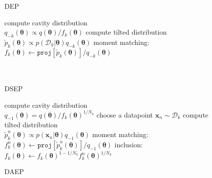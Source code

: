 \documentclass{article} %
\begin{document}
\begin{figure}[!t]
\begin{minipage}[t]{0.33\linewidth}
\centering
\begin{algorithm}[H] 
\caption{DEP} \small
\label{alg:dep} 
\begin{algorithmic}[1]
	\STATE compute cavity distribution \\$q_{-k}(\bm{\theta}) \propto q(\bm{\theta}) / f_k(\bm{\theta})$ 
	\STATE compute tilted distribution \\$\tilde{p}_k(\bm{\theta}) \propto p(\mathcal{D}_k|\bm{\theta}) q_{-k}(\bm{\theta})$
	\STATE moment matching: \\ \hspace{-3mm}$f_k(\bm{\theta}) \leftarrow \mathtt{proj}[\tilde{p}_k(\bm{\theta})] / q_{-k}(\bm{\theta}) $ \\
\hspace{1mm}\\ \vspace{1.5mm} \hspace{1mm}\\
\end{algorithmic}
\end{algorithm}
\end{minipage}
%
\begin{minipage}[t]{0.33\linewidth}
\centering
\begin{algorithm}[H] 
\caption{DSEP} \small
\label{alg:dsep} 
\begin{algorithmic}[1] 
	\STATE compute cavity distribution \\$q_{-1}(\bm{\theta}) = q(\bm{\theta}) / f_k(\bm{\theta})^{1 / N_k}$
	\STATE choose a datapoint $\bm{x}_n \sim \mathcal{D}_k$
	\STATE compute tilted distribution \\$\tilde{p}_k^n(\bm{\theta}) \propto p(\bm{x}_n|\bm{\theta}) q_{-1}(\bm{\theta})$
	\STATE moment matching: \\ \hspace{-1mm}$f_k^n(\bm{\theta}) \leftarrow \mathtt{proj}[\tilde{p}_k^n(\bm{\theta})] / q_{-1}(\bm{\theta}) $
	\STATE inclusion:\\ \hspace{-5mm} $f_k(\bm{\theta}) \leftarrow f_k(\bm{\theta})^{1 - 1/N_k} f_k^n(\bm{\theta})^{1/N_k}$
\end{algorithmic}
\end{algorithm}
\end{minipage}
\begin{minipage}[t]{0.33\linewidth}
\centering
\begin{algorithm}[H]
\caption{DAEP} \small
\label{alg:daep} 
\begin{algorithmic}[1] 


\end{algorithmic}
\end{algorithm}
\end{minipage}
\end{figure}
\end{document}
